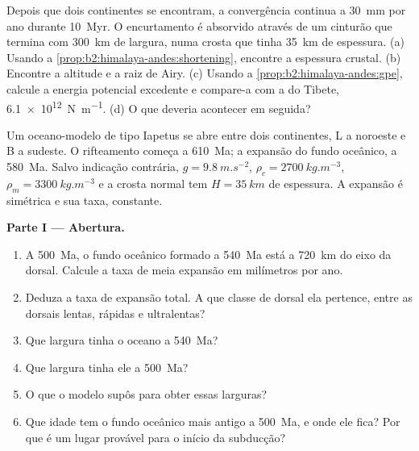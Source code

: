 \begin{exercise}[$\star\star\star$]\label{exo:b2:wilson-cycle:12}
Depois que dois continentes se encontram, a convergência continua a \qty{30}{mm} por ano durante \qty{10}{Myr}. O
encurtamento é absorvido através de um cinturão que termina com \qty{300}{km} de largura, numa crosta que tinha
\qty{35}{km} de espessura. (a) Usando a \cref{prop:b2:himalaya-andes:shortening}, encontre a espessura
crustal. (b) Encontre a altitude e a raiz de Airy. (c) Usando a \cref{prop:b2:himalaya-andes:gpe},
calcule a energia potencial excedente e compare-a com a do Tibete, \qty{6.1e12}{N.m^{-1}}.
(d) O que deveria acontecer em seguida?
\end{exercise}

\begin{problem}\label{pb:b2:wilson-cycle:1}
Um oceano-modelo de tipo Iapetus se abre entre dois continentes, L a noroeste e B a
sudeste. O rifteamento começa a \qty{610}{Ma}; a expansão do fundo oceânico, a \qty{580}{Ma}.
Salvo indicação contrária, $g = \qty{9.8}{m.s^{-2}}$, $\rho_c = \qty{2700}{kg.m^{-3}}$, $\rho_m =
\qty{3300}{kg.m^{-3}}$ e a crosta normal tem $H = \qty{35}{km}$ de espessura. A expansão é
simétrica e sua taxa, constante.

\medskip
\noindent\textbf{Parte I --- Abertura.}
\begin{enumerate}
\item A \qty{500}{Ma}, o fundo oceânico formado a \qty{540}{Ma} está a \qty{720}{km} do eixo
da dorsal. Calcule a taxa de meia expansão em milímetros por ano.
\item Deduza a taxa de expansão total. A que classe de dorsal ela pertence, entre as dorsais lentas,
rápidas e ultralentas?
\item Que largura tinha o oceano a \qty{540}{Ma}?
\item Que largura tinha ele a \qty{500}{Ma}?
\item O que o modelo supôs para obter essas larguras?
\item Que idade tem o fundo oceânico mais antigo a \qty{500}{Ma}, e onde ele fica? Por que é um
lugar provável para o início da subducção?
\end{enumerate}


\end{problem}
